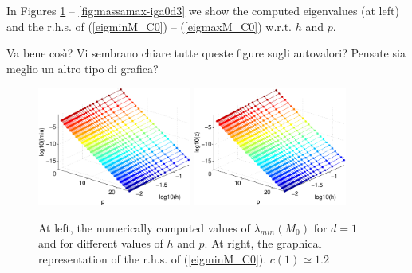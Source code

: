 \documentclass[11pt]{article}
\newcommand{\pg}{\color{red}}
\begin{document}
In Figures \ref{fig:massamin-iga0d1} -- \ref{fig:massamax-iga0d3} we 
show
the computed eigenvalues (at left) and the r.h.s. of
(\ref{eigminM_C0}) -- 
(\ref{eigmaxM_C0}) w.r.t. $h$ and $p$.

{\pg Va bene cos\`\i? Vi sembrano chiare tutte queste figure sugli autovalori? 
Pensate sia meglio 
un altro tipo di grafica?}

\begin{figure}[h]
\begin{center}
\includegraphics[width=0.45\textwidth]{Images/iga0_eigM1min.eps}\quad
\includegraphics[width=0.45\textwidth]{Images/iga0_eigM1smin.eps}\\
\end{center}
\caption{At left, the numerically computed values of 
$\lambda_{min}(M_0)$ for $d=1$ and 
for different values of $h$ and $p$. At right, 
the graphical representation of the r.h.s. of (\ref{eigminM_C0}). $c(1)
\simeq 1.2$}
\label{fig:massamin-iga0d1}
\end{figure}
\end{document}
